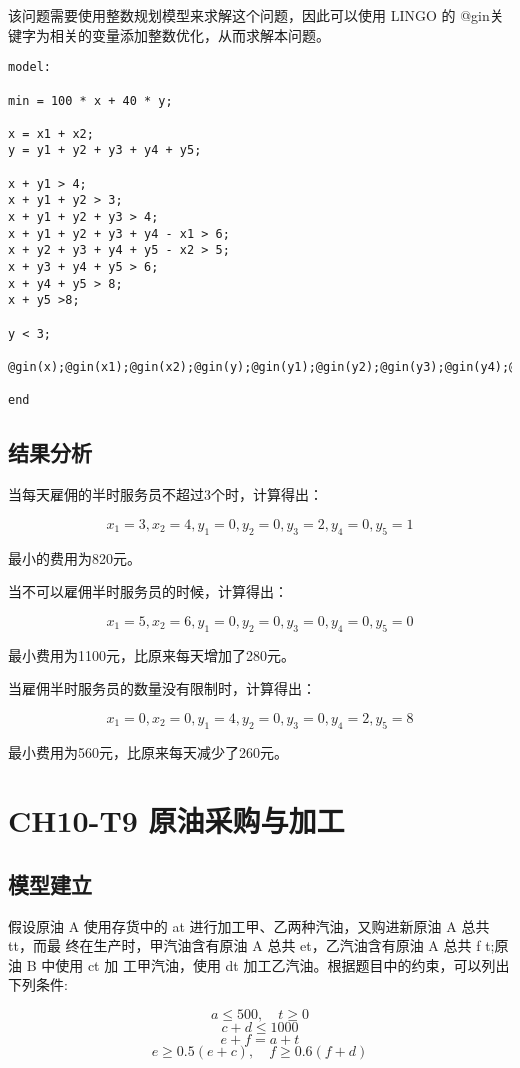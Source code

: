 \documentclass{article}
\begin{document}
该问题需要使用整数规划模型来求解这个问题，因此可以使用 LINGO 的 @gin关键字为相关的变量添加整数优化，从而求解本问题。

\begin{lstlisting}
model:

min = 100 * x + 40 * y;

x = x1 + x2;
y = y1 + y2 + y3 + y4 + y5;

x + y1 > 4;
x + y1 + y2 > 3;
x + y1 + y2 + y3 > 4;
x + y1 + y2 + y3 + y4 - x1 > 6;
x + y2 + y3 + y4 + y5 - x2 > 5;
x + y3 + y4 + y5 > 6;
x + y4 + y5 > 8;
x + y5 >8;

y < 3;

@gin(x);@gin(x1);@gin(x2);@gin(y);@gin(y1);@gin(y2);@gin(y3);@gin(y4);@gin(y5);

end
\end{lstlisting}

\subsection{结果分析}

当每天雇佣的半时服务员不超过3个时，计算得出：

$$x_1=3,x_2=4,y_1=0,y_2=0,y_3=2,y_4=0,y_5=1$$

最小的费用为820元。

当不可以雇佣半时服务员的时候，计算得出：

$$x_1=5,x_2=6,y_1=0,y_2=0,y_3=0,y_4=0,y_5=0$$

最小费用为1100元，比原来每天增加了280元。

当雇佣半时服务员的数量没有限制时，计算得出：

$$x_1=0,x_2=0,y_1=4,y_2=0,y_3=0,y_4=2,y_5=8$$

最小费用为560元，比原来每天减少了260元。



\section{CH10-T9 原油采购与加工}
\subsection{模型建立}

假设原油 A 使用存货中的 at 进行加工甲、乙两种汽油，又购进新原油 A 总共 tt，而最 终在生产时，甲汽油含有原油 A 总共 et，乙汽油含有原油 A 总共 f t;原油 B 中使用 ct 加 工甲汽油，使用 dt 加工乙汽油。根据题目中的约束，可以列出下列条件:

$$a\leq 500,\quad t\geq 0 $$
$$c+d\leq1000$$
$$e+f=a+t$$
$$e\geq0.5(e+c),\quad f\geq0.6(f+d)$$
\end{document}
